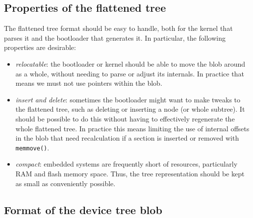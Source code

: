\documentclass[a4paper,twocolumn]{article}
\begin{document}
\subsection{Properties of the flattened tree}

The flattened tree format should be easy to handle, both for the
kernel that parses it and the bootloader that generates it.  In
particular, the following properties are desirable:

\begin{itemize}
\item \emph{relocatable}: the bootloader or kernel should be able to
  move the blob around as a whole, without needing to parse or adjust
  its internals.  In practice that means we must not use pointers
  within the blob.
\item \emph{insert and delete}: sometimes the bootloader might want to
  make tweaks to the flattened tree, such as deleting or inserting a
  node (or whole subtree).  It should be possible to do this without
  having to effectively regenerate the whole flattened tree.  In
  practice this means limiting the use of internal offsets in the blob
  that need recalculation if a section is inserted or removed with
  \texttt{memmove()}.
\item \emph{compact}: embedded systems are frequently short of
  resources, particularly RAM and flash memory space.  Thus, the tree
  representation should be kept as small as conveniently possible.
\end{itemize}

\subsection{Format of the device tree blob}
\label{sec:format}
\end{document}
